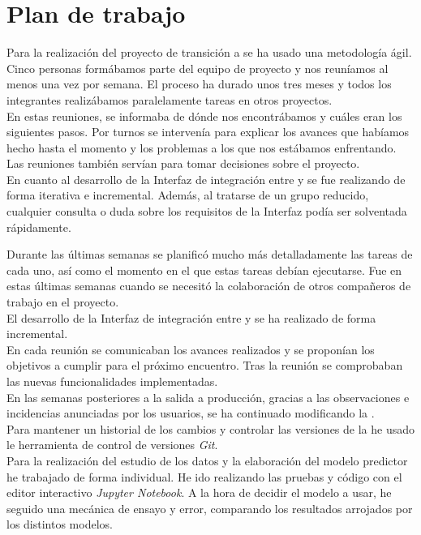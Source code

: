\section{Plan de trabajo}

Para la realización del proyecto de transición a \wday{} se ha usado una metodología ágil. 
Cinco personas formábamos parte del equipo de proyecto y nos reuníamos al menos una vez por semana.
El proceso ha durado unos tres meses y todos los integrantes realizábamos paralelamente tareas en otros proyectos.\\

En estas reuniones, se informaba de dónde nos encontrábamos y cuáles eran los siguientes pasos.
Por turnos se intervenía para explicar los avances que habíamos hecho hasta el momento y los problemas a los que nos estábamos enfrentando.
Las reuniones también servían para tomar decisiones sobre el proyecto.\\

En cuanto al desarrollo de la Interfaz de integración entre \hs{} y \wday{} se fue realizando de forma iterativa e incremental. 
Además, al tratarse de un grupo reducido, cualquier consulta o duda sobre los requisitos de la Interfaz podía ser solventada rápidamente.

Durante las últimas semanas se planificó mucho más detalladamente las tareas de cada uno, así como el momento en el que estas tareas debían ejecutarse.
Fue en estas últimas semanas cuando se necesitó la colaboración de otros compañeros de trabajo en el proyecto.\\

El desarrollo de la Interfaz de integración entre \hs{} y \wday{} se ha realizado de forma incremental.\\

En cada reunión se comunicaban los avances realizados y se proponían los objetivos a cumplir para el próximo encuentro. Tras la reunión se comprobaban las nuevas funcionalidades implementadas.\\

En las semanas posteriores a la salida a producción, gracias a las observaciones e incidencias anunciadas por los usuarios,
se ha continuado modificando la \iface{}. \\

Para mantener un historial de los cambios y controlar las versiones de la \iface{} he usado le herramienta de control de versiones \textit{Git}.\\

Para la realización del estudio de los datos y la elaboración del modelo predictor he trabajado de forma individual. 
He ido realizando las pruebas y código con el editor interactivo \textit{Jupyter Notebook}.
A la hora de decidir el modelo a usar, he seguido una mecánica de ensayo y error, comparando los resultados arrojados por los distintos modelos.


